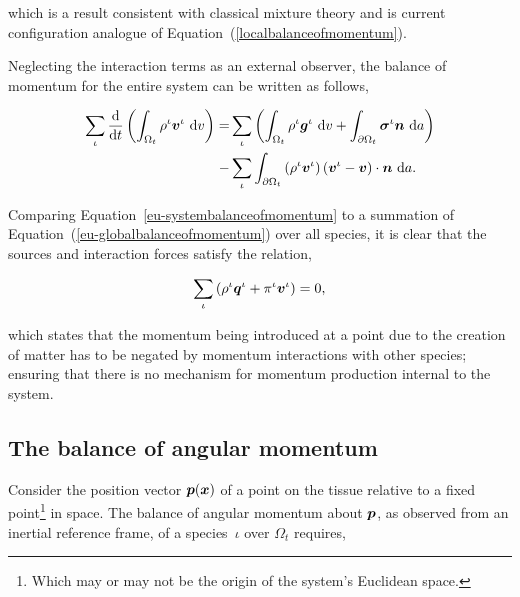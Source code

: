 \noindent which is a result consistent with classical mixture theory
\citep{TruesdellToupin:60} and is current configuration analogue of
Equation~(\ref{localbalanceofmomentum}).

Neglecting the interaction terms as an external observer, the balance
of momentum for the entire system can be written as follows,

\begin{equation}
\begin{split}
\sum\limits_{\iota}
\frac{\mathrm{d}}{\mathrm{d}t}\left(\int_{\Omega_{t}} \rho^{\iota}
\mbox{\boldmath$ v$}^{\iota} \ \mathrm{d}v \right) = & \sum\limits_{\iota}
\left(\int_{\Omega_{t}} \rho^{\iota} \mbox{\boldmath$ g$}^{\iota} \ \mathrm{d}v +
\int_{\partial \Omega_{t}} \mbox{\boldmath$\sigma$}^{\iota}\mbox{\boldmath$ n$}\ \mathrm{d}a\right)\\ -
&\sum\limits_{\iota}\int_{\partial \Omega_{t}} \left(\rho^{\iota}
\mbox{\boldmath$ v$}^{\iota} \right) \left(\mbox{\boldmath$ v$}^{\iota} - \mbox{\boldmath$ v$}\right) \cdot
\mbox{\boldmath$ n$}\ \mathrm{d}a.
\end{split}
\label{eu-systembalanceofmomentum}
\end{equation}

\noindent Comparing Equation~\ref{eu-systembalanceofmomentum} to a
summation of Equation~(\ref{eu-globalbalanceofmomentum}) over all
species, it is clear that the sources and interaction forces satisfy
the relation,

\begin{equation}
\sum\limits_{\iota}\left( \rho^{\iota}\mbox{\boldmath$ q$}^{\iota} + \pi^{\iota}
\mbox{\boldmath$ v$}^{\iota} \right) = 0,
\label{eu-summationrelationmomentum}
\end{equation}

\noindent which states that the momentum being introduced at a point
due to the creation of matter has to be negated by momentum
interactions with other species; ensuring that there is no mechanism
for momentum production internal to the system.

\subsection{The balance of angular momentum}
\label{eu-balance-of-angular-momentum}

Consider the position vector $\mbox{\boldmath$ p$}(\mbox{\boldmath$ x$})$ of a point on the tissue
relative to a fixed point\footnote{Which may or may not be the origin
  of the system's Euclidean space.} in space. The balance of angular
momentum about $\mbox{\boldmath$ p$}$, as observed from an inertial reference frame, of
a species~$\iota$ over $\Omega_{t}$ requires,

